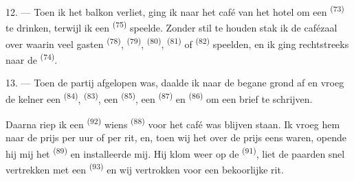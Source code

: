 12. --- Toen ik het balkon verliet, ging ik naar het café van het hotel om een
 \textsuperscript{(73)} te drinken, terwijl ik een
 \textsuperscript{(75)} speelde. Zonder stil te houden
stak ik de cafézaal over waarin veel gasten  \textsuperscript{(78)},
 \textsuperscript{(79)},
 \textsuperscript{(80)}, 
\textsuperscript{(81)} of  \textsuperscript{(82)} speelden, en ik ging
rechtstreeks naar de  \textsuperscript{(74)}.

13. --- Toen de partij afgelopen was, daalde ik naar de begane grond af en vroeg de kelner een
 \textsuperscript{(84)},  \textsuperscript{(83)}, een
 \textsuperscript{(85)}, een
 \textsuperscript{(87)} en  \textsuperscript{(86)} om
een brief te schrijven.

Daarna riep ik een  \textsuperscript{(92)} wiens
 \textsuperscript{(88)} voor het café was blijven staan. Ik vroeg
hem naar de prijs per uur of per rit, en, toen wij het over de prijs eens waren, opende hij
mij het  \textsuperscript{(89)} en installeerde mij. Hij klom weer op de
 \textsuperscript{(91)}, liet de paarden snel vertrekken met een 
\textsuperscript{(93)} en wij vertrokken voor een bekoorlijke rit.
\VUsaut{6.0mm}
\VUfilet{22mm}
